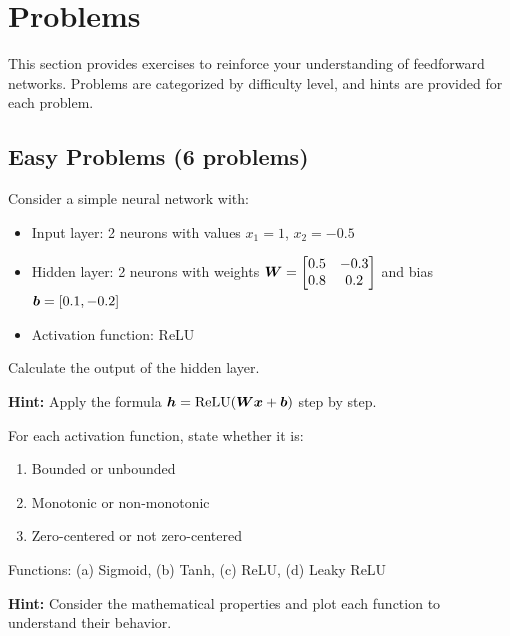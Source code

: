 
\section{Problems}
\label{sec:problems}

This section provides exercises to reinforce your understanding of feedforward networks. Problems are categorized by difficulty level, and hints are provided for each problem.

\subsection{Easy Problems (6 problems)}

\begin{problem}
\label{prob:forward-pass}

Consider a simple neural network with:
\begin{itemize}
    \item Input layer: 2 neurons with values $x_1 = 1$, $x_2 = -0.5$
    \item Hidden layer: 2 neurons with weights $\boldsymbol{W} = \begin{bmatrix} 0.5 & -0.3 \\ 0.8 & 0.2 \end{bmatrix}$ and bias $\boldsymbol{b} = [0.1, -0.2]$
    \item Activation function: ReLU
\end{itemize}

Calculate the output of the hidden layer.

\textbf{Hint:} Apply the formula $\boldsymbol{h} = \text{ReLU}(\boldsymbol{W}\boldsymbol{x} + \boldsymbol{b})$ step by step.
\end{problem}

\begin{problem}
\label{prob:activation-properties}

For each activation function, state whether it is:
\begin{enumerate}
    \item Bounded or unbounded
    \item Monotonic or non-monotonic
    \item Zero-centered or not zero-centered
\end{enumerate}

Functions: (a) Sigmoid, (b) Tanh, (c) ReLU, (d) Leaky ReLU

\textbf{Hint:} Consider the mathematical properties and plot each function to understand their behavior.
\end{problem}

